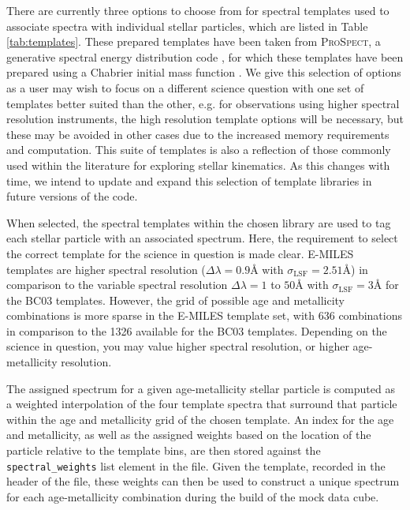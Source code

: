 \documentclass[
  journal=pasa,
  manuscript=research-paper, %
  year=2020,
  volume=37,
]{cup-journal}
\begin{document}
There are currently three options to choose from for spectral templates used to associate spectra with individual stellar particles, which are listed in Table \ref{tab:templates}. 
These prepared templates have been taken from \textsc{ProSpect}, a generative spectral energy distribution code \citep{Robotham2020ProSpect:Histories}, for which these templates have been prepared using a Chabrier initial mass function \citep{Chabrier2003GalacticFunction}.
We give this selection of options as a user may wish to focus on a different science question with one set of templates better suited than the other, e.g. for observations using higher spectral resolution instruments, the high resolution template options will be necessary, but these may be avoided in other cases due to the increased memory requirements and computation. 
This suite of templates is also a reflection of those commonly used within the literature for exploring stellar kinematics. 
As this changes with time, we intend to update and expand this selection of template libraries in future versions of the code.

When selected, the spectral templates within the chosen library are used to tag each stellar particle with an associated spectrum.
Here, the requirement to select the correct template for the science in question is made clear. 
E-MILES templates are higher spectral resolution ($\Delta \lambda = 0.9$\AA{} with $\sigma_{\text{LSF}} = 2.51$\AA{}) in comparison to the variable spectral resolution $\Delta \lambda = 1$ to $50$\AA{} with $\sigma_{\text{LSF}} = 3$\AA{} for the BC03 templates. However, the grid of possible age and metallicity combinations is more sparse in the E-MILES template set, with 636 combinations in comparison to the 1326 available for the BC03 templates. 
Depending on the science in question, you may value higher spectral resolution, or higher age-metallicity resolution.

The assigned spectrum for a given age-metallicity stellar particle is computed as a weighted interpolation of the four template spectra that surround that particle within the age and metallicity grid of the chosen template.  
An index for the age and metallicity, as well as the assigned weights based on the location of the particle relative to the template bins, are then stored against the \texttt{spectral\_weights} list element in the file.
Given the template, recorded in the header of the file, these weights can then be used to construct a unique spectrum for each age-metallicity combination during the build of the mock data cube.
\end{document}
